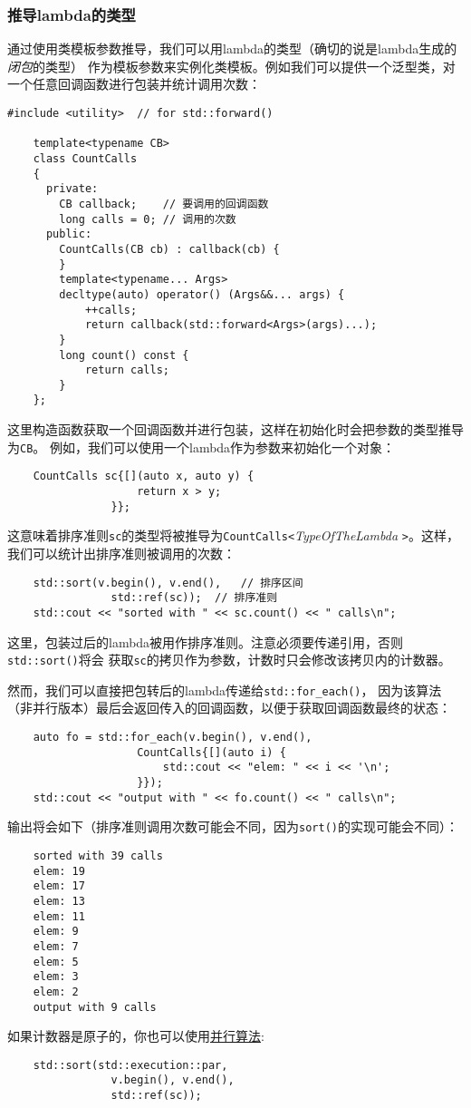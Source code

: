 \subsubsection{推导lambda的类型}
通过使用类模板参数推导，我们可以用lambda的类型（确切的说是lambda生成的\emph{闭包}的类型）
作为模板参数来实例化类模板。例如我们可以提供一个泛型类，对一个任意回调函数进行包装并统计调用次数：
\begin{lstlisting}[frame=single, title=tmpl/classarglambda.hpp]
    #include <utility>  // for std::forward()

    template<typename CB>
    class CountCalls
    {
      private:
        CB callback;    // 要调用的回调函数
        long calls = 0; // 调用的次数
      public:
        CountCalls(CB cb) : callback(cb) {
        }
        template<typename... Args>
        decltype(auto) operator() (Args&&... args) {
            ++calls;
            return callback(std::forward<Args>(args)...);
        }
        long count() const {
            return calls;
        }
    };
\end{lstlisting}
这里构造函数获取一个回调函数并进行包装，这样在初始化时会把参数的类型推导为\texttt{CB}。
例如，我们可以使用一个lambda作为参数来初始化一个对象：
\begin{lstlisting}
    CountCalls sc{[](auto x, auto y) {
                    return x > y;
                }};
\end{lstlisting}
这意味着排序准则\texttt{sc}的类型将被推导为\texttt{CountCalls<}\emph{TypeOfTheLambda}
\texttt{>}。这样，我们可以统计出排序准则被调用的次数：
\begin{lstlisting}
    std::sort(v.begin(), v.end(),   // 排序区间
                std::ref(sc));  // 排序准则
    std::cout << "sorted with " << sc.count() << " calls\n";
\end{lstlisting}
这里，包装过后的lambda被用作排序准则。注意必须要传递引用，否则\texttt{std::sort()}将会
获取\texttt{sc}的拷贝作为参数，计数时只会修改该拷贝内的计数器。

然而，我们可以直接把包转后的lambda传递给\texttt{std::for\_each()}，
因为该算法（非并行版本）最后会返回传入的回调函数，以便于获取回调函数最终的状态：
\begin{lstlisting}
    auto fo = std::for_each(v.begin(), v.end(),
                    CountCalls{[](auto i) {
                        std::cout << "elem: " << i << '\n';
                    }});
    std::cout << "output with " << fo.count() << " calls\n";
\end{lstlisting}
输出将会如下（排序准则调用次数可能会不同，因为\texttt{sort()}的实现可能会不同）：
\begin{lstlisting}
    sorted with 39 calls
    elem: 19
    elem: 17
    elem: 13
    elem: 11
    elem: 9
    elem: 7
    elem: 5
    elem: 3
    elem: 2
    output with 9 calls
\end{lstlisting}
如果计数器是原子的，你也可以使用\hyperref[ch22]{并行算法}:
\begin{lstlisting}
    std::sort(std::execution::par,
                v.begin(), v.end(),
                std::ref(sc));
\end{lstlisting}


